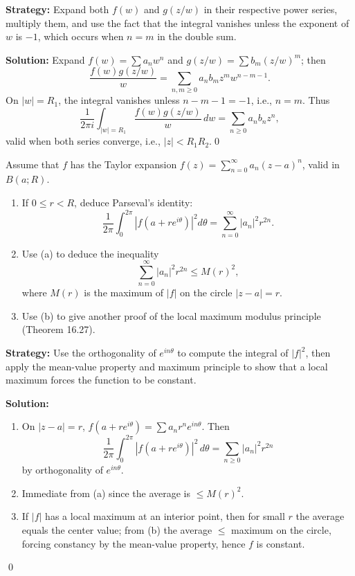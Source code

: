 \noindent\textbf{Strategy:} Expand both \( f(w) \) and \( g(z/w) \) in their respective power series, multiply them, and use the fact that the integral vanishes unless the exponent of \( w \) is \(-1\), which occurs when \( n = m \) in the double sum.

\bigskip\noindent\textbf{Solution:}
Expand $f(w)=\sum a_n w^n$ and $g(z/w)=\sum b_m (z/w)^m$; then
\[\frac{f(w)g(z/w)}{w}=\sum_{n,m\ge0} a_n b_m z^m w^{n-m-1}.\]
On $|w|=R_1$, the integral vanishes unless $n-m-1=-1$, i.e., $n=m$. Thus
\[\frac{1}{2\pi i}\int_{|w|=R_1}\frac{f(w)g(z/w)}{w}\,dw=\sum_{n\ge0} a_n b_n z^n,\]
valid when both series converge, i.e., $|z|<R_1R_2$.\qed


\begin{problembox}
Assume that \( f \) has the Taylor expansion \( f(z) = \sum_{n=0}^{\infty} a_n (z - a)^n \), valid in \( B(a; R) \).
\begin{enumerate}[label=(\alph*)]
\item If \( 0 \leq r < R \), deduce Parseval's identity:
\[ \frac{1}{2\pi} \int_0^{2\pi} |f(a + r e^{i\theta})|^2 d\theta = \sum_{n=0}^{\infty} |a_n|^2 r^{2n}. \]
\item Use (a) to deduce the inequality
\[ \sum_{n=0}^{\infty} |a_n|^2 r^{2n} \leq M(r)^2, \]
where \( M(r) \) is the maximum of \( |f| \) on the circle \( |z - a| = r \).
\item Use (b) to give another proof of the local maximum modulus principle (Theorem 16.27).
\end{enumerate}
\end{problembox}

\noindent\textbf{Strategy:} Use the orthogonality of \( e^{in\theta} \) to compute the integral of \( |f|^2 \), then apply the mean-value property and maximum principle to show that a local maximum forces the function to be constant.

\bigskip\noindent\textbf{Solution:}
\begin{enumerate}[label=(\alph*)]
\item On $|z-a|=r$, $f(a+re^{i\theta})=\sum a_n r^n e^{in\theta}$. Then
\[\frac{1}{2\pi}\int_0^{2\pi}|f(a+re^{i\theta})|^2\,d\theta=\sum_{n\ge0}|a_n|^2 r^{2n}\]
by orthogonality of $e^{in\theta}$.
\item Immediate from (a) since the average is $\le M(r)^2$.
\item If $|f|$ has a local maximum at an interior point, then for small $r$ the average equals the center value; from (b) the average $\le$ maximum on the circle, forcing constancy by the mean-value property, hence $f$ is constant.
\end{enumerate}\qed


